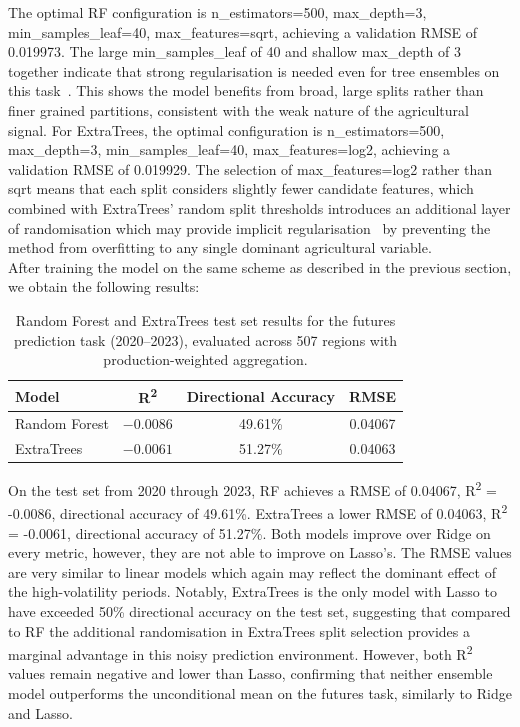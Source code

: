\documentclass[pdflatex,sn-mathphys-num, oneside, 11pt]{sn-jnl}%
\theoremstyle{thmstyleone}%
\theoremstyle{thmstyletwo}%
\theoremstyle{thmstylethree}%
\begin{document}
The optimal RF configuration is n\_estimators=500, max\_depth=3, min\_samples\_leaf=40, max\_features=sqrt, achieving a validation RMSE of 0.019973. The large min\_samples\_leaf of 40 and shallow max\_depth of 3 together indicate that strong regularisation is needed even for tree ensembles on this task~\cite{bib34,bib24}. This shows the model benefits from broad, large splits rather than finer grained partitions, consistent with the weak nature of the agricultural signal. For ExtraTrees, the optimal configuration is n\_estimators=500, max\_depth=3, min\_samples\_leaf=40, max\_features=log2, achieving a validation RMSE of 0.019929.
The selection of max\_features=log2 rather than sqrt means that each split considers slightly fewer candidate features, which combined with ExtraTrees' random split thresholds introduces an additional layer of randomisation which may provide implicit regularisation~\cite{bib32} by preventing the method from overfitting to any single dominant agricultural variable.\\

After training the model on the same scheme as described in the previous section, we obtain the following results:

\begin{table}[ht!]
\centering
\caption{Random Forest and ExtraTrees test set results for the futures prediction task (2020--2023), evaluated across 507 regions with production-weighted aggregation.}
\label{tab:tree_futures}
\begin{tabular}{lccc}
\toprule
\textbf{Model} & \textbf{R\textsuperscript{2}} & \textbf{Directional Accuracy} & \textbf{RMSE} \\
\midrule
Random Forest & $-0.0086$ & 49.61\% & 0.04067 \\
ExtraTrees    & $-0.0061$ & 51.27\% & 0.04063 \\
\bottomrule
\end{tabular}
\end{table}
On the test set from 2020 through 2023, RF achieves a RMSE of 0.04067, R\textsuperscript{2} = -0.0086, directional accuracy of 49.61\%. ExtraTrees a lower RMSE of 0.04063, R\textsuperscript{2} = -0.0061, directional accuracy of 51.27\%. Both models improve over Ridge on every metric, however, they are not able to improve on Lasso's. The RMSE values are very similar to linear models which again may reflect the dominant effect of the high-volatility periods. Notably, ExtraTrees is the only model with Lasso to have exceeded 50\% directional accuracy on the test set, suggesting that compared to RF the additional randomisation in ExtraTrees split selection provides a marginal advantage in this noisy prediction environment. However, both R\textsuperscript{2} values remain negative and lower than Lasso, confirming that neither ensemble model outperforms the unconditional mean on the futures task, similarly to Ridge and Lasso.\\
\end{document}
